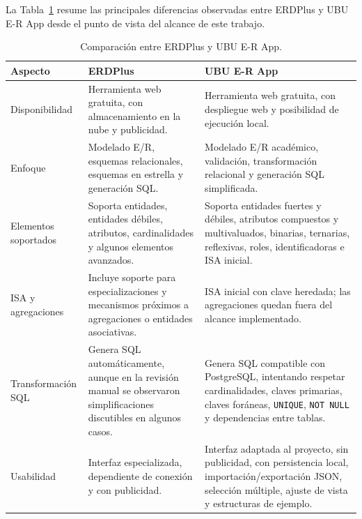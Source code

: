 La Tabla~\ref{tab:comparativa_erdplus_ubu} resume las principales diferencias observadas entre ERDPlus y UBU E-R App desde el punto de vista del alcance de este trabajo.

\begin{table}[htbp]
    \centering
    \small
    \caption{Comparación entre ERDPlus y UBU E-R App.}
    \label{tab:comparativa_erdplus_ubu}
    \begin{tabular}{p{} p{} p{}}
        \toprule
        \textbf{Aspecto} & \textbf{ERDPlus} & \textbf{UBU E-R App} \\
        \midrule
        Disponibilidad
        & Herramienta web gratuita, con almacenamiento en la nube y publicidad.
        & Herramienta web gratuita, con despliegue web y posibilidad de ejecución local. \\

        Enfoque
        & Modelado E/R, esquemas relacionales, esquemas en estrella y generación SQL.
        & Modelado E/R académico, validación, transformación relacional y generación SQL simplificada. \\

        Elementos soportados
        & Soporta entidades, entidades débiles, atributos, cardinalidades y algunos elementos avanzados.
        & Soporta entidades fuertes y débiles, atributos compuestos y multivaluados, binarias, ternarias, reflexivas, roles, identificadoras e ISA inicial. \\

        ISA y agregaciones
        & Incluye soporte para especializaciones y mecanismos próximos a agregaciones o entidades asociativas.
        & ISA inicial con clave heredada; las agregaciones quedan fuera del alcance implementado. \\

        Transformación SQL
        & Genera SQL automáticamente, aunque en la revisión manual se observaron simplificaciones discutibles en algunos casos.
        & Genera SQL compatible con PostgreSQL, intentando respetar cardinalidades, claves primarias, claves foráneas, \texttt{UNIQUE}, \texttt{NOT NULL} y dependencias entre tablas. \\

        Usabilidad
        & Interfaz especializada, dependiente de conexión y con publicidad.
        & Interfaz adaptada al proyecto, sin publicidad, con persistencia local, importación/exportación JSON, selección múltiple, ajuste de vista y estructuras de ejemplo. \\
        \bottomrule
    \end{tabular}
\end{table}

